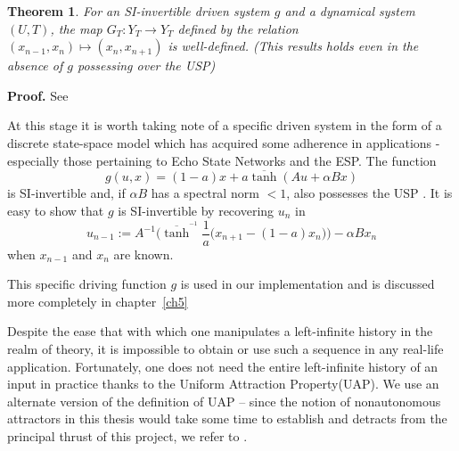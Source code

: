 \documentclass[a4paper,12pt,twoside]{report}
\newtheorem{Theorem}{Theorem}[]
\begin{document}
\begin{Theorem}\label{Thm_GT_Exists}
  For an SI-invertible driven system $g$ and a dynamical system $(U,T)$, the map $G_T: Y_T \to Y_T$ defined by the relation $(x_{n-1},x_n) \mapsto (x_n,x_{n+1})$ is well-defined. 
  (This results holds even in the absence of $g$ possessing over the USP) 
  \end{Theorem}
  {\bf Proof.} See~\cite[Th.3]{Supp}



At this stage it is worth taking note of a specific driven system in the form of a discrete state-space model which has acquired some adherence in applications \cite{Manju_IEEE}- especially those pertaining to Echo State Networks and the ESP. The function 
\begin{equation}  \label{eqn_driving}
  g(u,x) = (1-a)x + a\overline{\tanh}(Au + \alpha Bx)
\end{equation} 
is SI-invertible and, if $\alpha B$ has a spectral norm $<1$, also possesses the USP \cite[Th.2]{manjunath2013echo }. 
It is easy to show that $g$ is SI-invertible by recovering $u_n$ in 
\begin{equation} \label{eqn_SI_RNN}
  u_{n-1} := A^{-1}\bigg(\overline{\tanh}^{^{-1}}\frac{1}{a}\Big(x_{n+1}-(1-a)x_n\Big) \bigg) - \alpha B x_n
  \end{equation}
  when $x_{n-1}$ and $x_n$ are known.


This specific driving function $g$ is used in our implementation and is discussed more completely in chapter~\ref{ch5}

Despite the ease that with which one manipulates a left-infinite history in the realm of theory, it is impossible to obtain or use such a sequence in any real-life application.  
Fortunately, one does not need the entire left-infinite history of an input in practice thanks to the Uniform Attraction Property(UAP). 
We use an alternate version of the definition of UAP -- since the notion of nonautonomous attractors in this thesis would take some time to establish and detracts from the principal thrust of this project, we refer to \cite{Manju_Nonlinearity}. 
\end{document}

